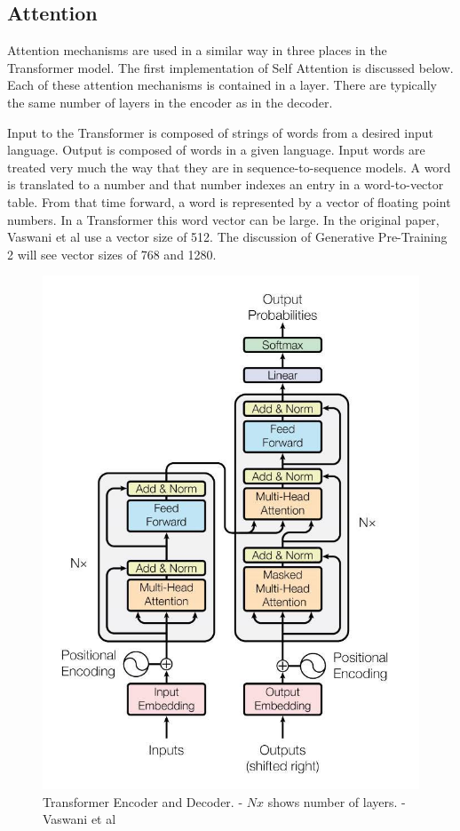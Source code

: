 \subsection{Attention}
Attention mechanisms are used in a similar way in three places in the Transformer model. The first implementation of Self Attention is discussed below. Each of these attention mechanisms is contained in a layer. There are typically the same number of layers in the encoder as in the decoder.

Input to the Transformer is composed of strings of words from a desired input language. Output is composed of words in a given language. Input words are treated very much the way that they are in sequence-to-sequence models. A word is translated to a number and that number indexes an entry in a word-to-vector table. From that time forward, a word is represented by a vector of floating point numbers. In a Transformer this word vector can be large. In the original paper, Vaswani et al \cite{Vaswani2017AttentionIA} use a vector size of 512. The discussion of Generative Pre-Training 2 will see vector sizes of 768 and 1280.

\begin{figure}[H]
	\begin{center}
		
		
		\includegraphics[scale=1.5]{diagram-mat04}
	\end{center}
	\caption[Transformer Encoder and Decoder]{Transformer Encoder and Decoder. - $Nx$ shows number of layers. - Vaswani et al \cite{Vaswani2017AttentionIA}}
	
	
\end{figure}

